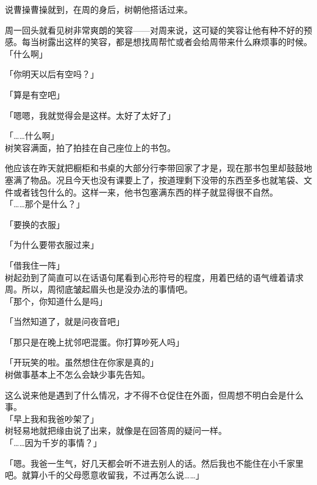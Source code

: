 说曹操曹操就到，在周的身后，树朝他搭话过来。

周一回头就看见树非常爽朗的笑容——对周来说，这可疑的笑容让他有种不好的预感。每当树露出这样的笑容，都是想找周帮忙或者会给周带来什么麻烦事的时候。\\

「什么啊」

「你明天以后有空吗？」

「算是有空吧」

「嗯嗯，我就觉得会是这样。太好了太好了」

「……什么啊」\\

树笑容满面，拍了拍挂在自己座位上的书包。

他应该在昨天就把橱柜和书桌的大部分行李带回家了才是，现在那书包里却鼓鼓地塞满了物品。况且今天也没有课要上了，按道理剩下没带的东西至多也就笔袋、文件或者钱包什么的。这样一来，他书包塞满东西的样子就显得很不自然。\\

「……那个是什么？」

「要换的衣服」

「为什么要带衣服过来」

「借我住一阵」\\

树起劲到了简直可以在话语句尾看到心形符号的程度，用着巴结的语气缠着请求周。所以，周彻底皱起眉头也是没办法的事情吧。\\

「那个，你知道什么是吗」

「当然知道了，就是问夜音吧」

「那只是在晚上扰邻吧混蛋。你打算吵死人吗」

「开玩笑的啦。虽然想住在你家是真的」\\

树做事基本上不怎么会缺少事先告知。

这么说来他是遇到了什么情况，才不得不仓促住在外面，但周想不明白会是什么事。\\

「早上我和我爸吵架了」\\

树轻易地就把缘由说了出来，就像是在回答周的疑问一样。\\

「……因为千岁的事情？」

「嗯。我爸一生气，好几天都会听不进去别人的话。然后我也不能住在小千家里吧。就算小千的父母愿意收留我，不过再怎么说……」


